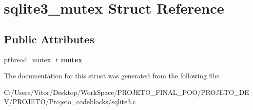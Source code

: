 \hypertarget{structsqlite3__mutex}{\section{sqlite3\-\_\-mutex Struct Reference}
\label{structsqlite3__mutex}
}
\subsection*{Public Attributes}
\begin{DoxyCompactItemize}
\item 
\hypertarget{structsqlite3__mutex_a6eef25bee73a3640dbbd052d707dbfdc}{pthread\-\_\-mutex\-\_\-t {\bfseries mutex}}\label{structsqlite3__mutex_a6eef25bee73a3640dbbd052d707dbfdc}

\end{DoxyCompactItemize}


The documentation for this struct was generated from the following file\-:\begin{DoxyCompactItemize}
\item 
C\-:/\-Users/\-Vitor/\-Desktop/\-Work\-Space/\-P\-R\-O\-J\-E\-T\-O\-\_\-\-F\-I\-N\-A\-L\-\_\-\-P\-O\-O/\-P\-R\-O\-J\-E\-T\-O\-\_\-\-D\-E\-V/\-P\-R\-O\-J\-E\-T\-O/\-Projeto\-\_\-codeblocks/sqlite3.\-c\end{DoxyCompactItemize}
